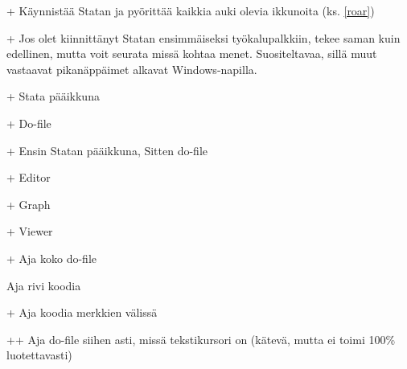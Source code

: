 \documentclass[a4paper,12pt]{scrartcl}
\begin{document}
\medskip

+ Käynnistää Statan ja pyörittää kaikkia auki olevia ikkunoita (ks. \ref{roar})

+ Jos olet kiinnittänyt Statan ensimmäiseksi työkalupalkkiin, tekee saman kuin edellinen, mutta voit seurata missä kohtaa menet. Suositeltavaa, sillä muut vastaavat pikanäppäimet alkavat Windows-napilla.

+ Stata pääikkuna

+\keys{\shift} Do-file

+\keys{\textgreater} Ensin Statan pääikkuna, Sitten do-file

+ Editor

+ Graph

+ Viewer

\medskip

\keys{\ctrl}+ Aja koko do-file

\keys{\ctrl + \return} Aja rivi koodia

+\keys{\return} Aja koodia merkkien \keys{\{} \keys{\}} välissä

++ Aja do-file siihen asti, missä tekstikursori on (kätevä, mutta ei toimi 100\% luotettavasti)


\end{document}
